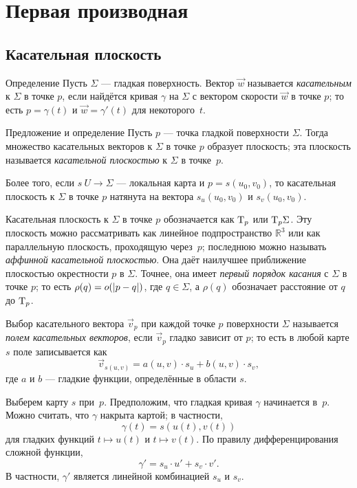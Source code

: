 \chapter{Первая производная}
\label{chap:first-order}
\section{Касательная плоскость}

\begin{thm}{Определение}\label{def:tangent-vector}
Пусть $\Sigma$ --- гладкая поверхность.
Вектор $\vec w$ называется \emph{касательным} к $\Sigma$ в точке $p$, если найдётся кривая $\gamma$ на $\Sigma$ с вектором скорости $\vec w$ в точке $p$;
то есть $p=\gamma(t)$ и $\vec w=\gamma'(t)$ для некоторого~$t$.
\end{thm}

\begin{thm}{Предложение и определение}\label{def:tangent-plane}
Пусть $p$ --- точка гладкой поверхности $\Sigma$.
Тогда множество касательных векторов к $\Sigma$ в точке $p$ образует плоскость;
эта плоскость называется \emph{касательной плоскостью} к $\Sigma$ в точке~$p$.

Более того, если $s\:U\to \Sigma$ --- локальная карта и $p=s(u_0,v_0)$, то 
касательная плоскость к $\Sigma$ в точке $p$ натянута на вектора $s_u(u_0,v_0)$ и $s_v(u_0,v_0)$.
\end{thm}

Касательная плоскость к $\Sigma$ в точке $p$ обозначается как $\mathrm{T}_p$ или $\mathrm{T}_p\Sigma$.
Эту плоскость можно рассматривать как линейное подпространство $\mathbb{R}^3$ или как параллельную плоскость, проходящую через~$p$;
последнюю можно называть \emph{аффинной касательной плоскостью}.
Она даёт наилучшее приближение плоскостью окрестности $p$ в $\Sigma$.
Точнее, 
она имеет \emph{первый порядок касания} с $\Sigma$ в точке $p$;
то есть $\rho(q)\z=o(|p\z-q|)$, где $q\in \Sigma$, а $\rho(q)$ обозначает расстояние от $q$ до $\mathrm{T}_p$.

Выбор касательного вектора $\vec v_p$ при каждой точке $p$ поверхности $\Sigma$ называется \emph{полем касательных векторов}, если $\vec v_p$ гладко зависит от $p$;
то есть в любой карте $s$ поле записывается как
\[\vec v_{s(u,v)}=a(u,v)\cdot s_u+b(u,v)\cdot s_v,\]
где $a$ и $b$ --- гладкие функции, определённые в области $s$.

Выберем карту $s$ при~$p$.
Предположим, что гладкая кривая $\gamma$ начинается в~$p$.
Можно считать, что $\gamma$ накрыта картой;
в частности, 
\[\gamma(t)=s(u(t),v(t))\]
для гладких функций $t\mapsto u(t)$ и $t\mapsto v(t)$.
По правилу дифференцирования сложной функции, 
\[\gamma'=s_u\cdot u'+ s_v\cdot v'.\]
В частности, $\gamma'$ является линейной комбинацией $s_u$ и $s_v$.

